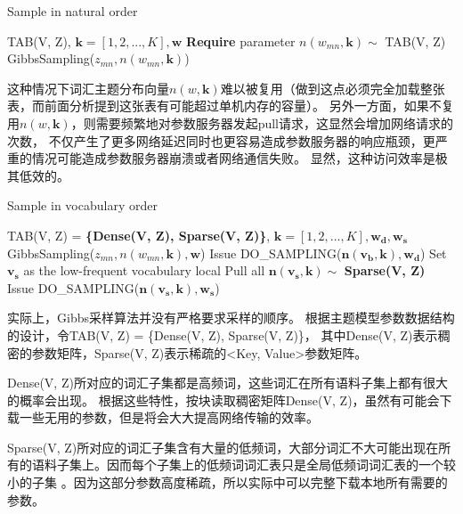 \begin{algorithm}[htb]
\label{alg:natural-order}
\caption{Sample in natural order}
\begin{algorithmic}[1] 
\Require TAB(V, Z), $\mathbf{k} = [1, 2, ..., K], \mathbf{w}$
\State \textbf{Require} parameter $n(w_{mn}, \mathbf{k}) \sim$ TAB(V, Z)
\State GibbsSampling($z_{mn}, n(w_{mn}, \mathbf{k})$)
\EndFor
\EndFor
\end{algorithmic}  
\end{algorithm}  

这种情况下词汇主题分布向量$n(w, \mathbf{k})$难以被复用（做到这点必须完全加载整张表，而前面分析提到这张表有可能超过单机内存的容量）。
另外一方面，如果不复用$n(w, \mathbf{k})$，则需要频繁地对参数服务器发起pull请求，这显然会增加网络请求的次数，
不仅产生了更多网络延迟同时也更容易造成参数服务器的响应瓶颈，更严重的情况可能造成参数服务器崩溃或者网络通信失败。
显然，这种访问效率是极其低效的。

\begin{algorithm}[htb]
\caption{Sample in vocabulary order} 
\label{alg:vocab-order}
\begin{algorithmic}[1]
\Require TAB(V, Z) = \textbf{\{Dense(V, Z), Sparse(V, Z)\}}, $\mathbf{k} = [1, 2, ..., K], \mathbf{w_d, w_s}$
\State GibbsSampling($z_{mn}, n(w_{mn}, \mathbf{k}), \mathbf{w}$)
\EndFor
\EndFor
\EndFunction
{}
\State Issue DO\_SAMPLING($\mathbf{n(v_b, k), w_d}$)
\EndFor
\State Set $\mathbf{v_s}$ as the low-frequent vocabulary local
\State Pull all $\mathbf{n(v_s, k)} \sim $ \textbf{Sparse(V, Z)}
\State Issue DO\_SAMPLING($\mathbf{n(v_s, k), w_s}$)
\end{algorithmic}  
\end{algorithm}  

实际上，Gibbs采样算法并没有严格要求采样的顺序。
根据主题模型参数数据结构的设计，令TAB(V, Z) = \{Dense(V, Z), Sparse(V, Z)\}，
其中Dense(V, Z)表示稠密的参数矩阵，Sparse(V, Z)表示稀疏的<Key, Value>参数矩阵。

Dense(V, Z)所对应的词汇子集都是高频词，这些词汇在所有语料子集上都有很大的概率会出现。
根据这些特性，按块读取稠密矩阵Dense(V, Z)，虽然有可能会下载一些无用的参数，但是将会大大提高网络传输的效率。

Sparse(V, Z)所对应的词汇子集含有大量的低频词，大部分词汇不大可能出现在所有的语料子集上。因而每个子集上的低频词词汇表只是全局低频词词汇表的一个较小的子集
。因为这部分参数高度稀疏，所以实际中可以完整下载本地所有需要的参数。

